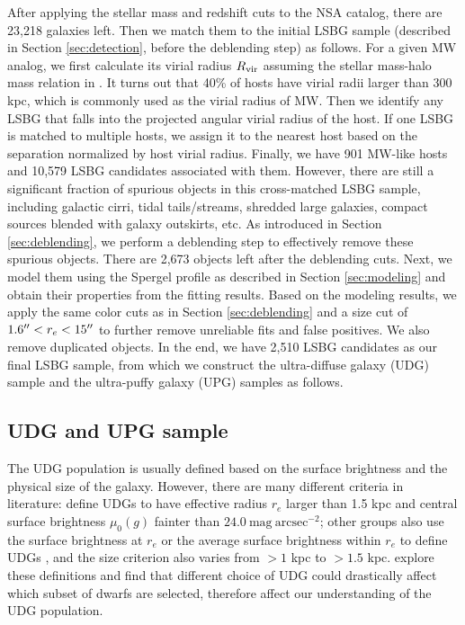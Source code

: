 \documentclass[twocolumn,astrosymb,twocolappendix]{aastex631}
\newcommand{\sbunit}{\mathrm{mag\ arcsec}^{-2}}
\begin{document}
\begin{CJK*}{UTF8}{gbsn}
After applying the stellar mass and redshift cuts to the NSA catalog, there are 23,218 galaxies left. Then we match them to the initial LSBG sample (described in Section \ref{sec:detection}, before the deblending step) as follows. For a given MW analog, we first calculate its virial radius $R_{\rm vir}$ assuming the stellar mass-halo mass relation in \citet{Behroozi2010}. It turns out that 40\% of hosts have virial radii larger than 300 kpc, which is commonly used as the virial radius of MW. Then we identify any LSBG that falls into the projected angular virial radius of the host. If one LSBG is matched to multiple hosts, we assign it to the nearest host based on the separation normalized by host virial radius. Finally, we have 901 MW-like hosts and 10,579 LSBG candidates associated with them. 
However, there are still a significant fraction of spurious objects in this cross-matched LSBG sample, including galactic cirri, tidal tails/streams, shredded large galaxies, compact sources blended with galaxy outskirts, etc. As introduced in Section \ref{sec:deblending}, we perform a deblending step to effectively remove these spurious objects. There are 2,673 objects left after the deblending cuts. Next, we model them using the Spergel profile as described in Section \ref{sec:modeling} and obtain their properties from the fitting results. Based on the modeling results, we apply the same color cuts as in Section \ref{sec:deblending} and a size cut of $1.6\mbox{$^{\prime\prime}$} < r_e < 15\mbox{$^{\prime\prime}$}$ to further remove unreliable fits and false positives. We also remove duplicated objects. In the end, we have 2,510 LSBG candidates as our final LSBG sample, from which we construct the ultra-diffuse galaxy (UDG) sample and the ultra-puffy galaxy (UPG) samples as follows. 

\subsection{UDG and UPG sample}\label{sec:sample}
The UDG population is usually defined based on the surface brightness and the physical size of the galaxy. However, there are many different criteria in literature: \citep{vanDokkum2015} define UDGs to have effective radius $r_e$ larger than 1.5 kpc and central surface brightness $\mu_0(g)$ fainter than $24.0\ \sbunit$; other groups also use the surface brightness at $r_e$ \citep[e.g.,][]{DiCintio2017,Cardona-Barrero2020} or the average surface brightness within $r_e$ to define UDGs \citep[e.g.,][]{Koda2015,Yagi2016,vdBurg2016,Leisman2017,Martin2019}, and the size criterion also varies from $>1$ kpc to $>1.5$ kpc. \citet{vanNest2022} explore these definitions and find that different choice of UDG could drastically affect which subset of dwarfs are selected, therefore affect our understanding of the UDG population.


\end{CJK*}
\end{document}
